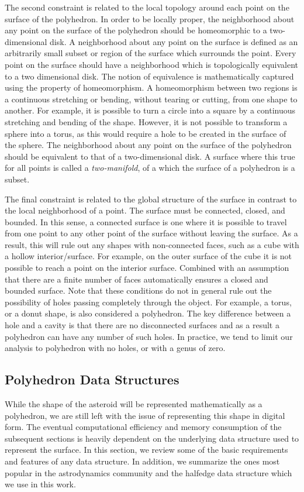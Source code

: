 The second constraint is related to the local topology around each point on the surface of the polyhedron.
In order to be locally proper, the neighborhood about any point on the surface of the polyhedron should be homeomorphic to a two-dimensional disk.
A neighborhood about any point on the surface is defined as an arbitrarily small subset or region of the surface which surrounds the point.
Every point on the surface should have a neighborhood which is topologically equivalent to a two dimensional disk.
The notion of equivalence is mathematically captured using the property of homeomorphism.
A homeomorphism between two regions is a continuous stretching or bending, without tearing or cutting, from one shape to another.
For example, it is possible to turn a circle into a square by a continuous stretching and bending of the shape.
However, it is not possible to transform a sphere into a torus, as this would require a hole to be created in the surface of the sphere.
The neighborhood about any point on the surface of the polyhedron should be equivalent to that of a two-dimensional disk.
A surface where this true for all points is called a \textit{two-manifold}, of a which the surface of a polyhedron is a subset.

The final constraint is related to the global structure of the surface in contrast to the local neighborhood of a point.
The surface must be connected, closed, and bounded.
In this sense, a connected surface is one where it is possible to travel from one point to any other point of the surface without leaving the surface. 
As a result, this will rule out any shapes with non-connected faces, such as a cube with a hollow interior/surface.
For example, on the outer surface of the cube it is not possible to reach a point on the interior surface. 
Combined with an assumption that there are a finite number of faces automatically ensures a closed and bounded surface. 
Note that these conditions do not in general rule out the possibility of holes passing completely through the object.
For example, a torus, or a donut shape, is also considered a polyhedron.
The key difference between a hole and a cavity is that there are no disconnected surfaces and as a result a polyhedron can have any number of such holes. 
In practice, we tend to limit our analysis to polyhedron with no holes, or with a genus of zero.


\subsection{Polyhedron Data Structures}\label{sec:polyhedron_data_structures}
While the shape of the asteroid will be represented mathematically as a polyhedron, we are still left with the issue of representing this shape in digital form. 
The eventual computational efficiency and memory consumption of the subsequent sections is heavily dependent on the underlying data structure used to represent the surface.
In this section, we review some of the basic requirements and features of any data structure.
In addition, we summarize the ones most popular in the astrodynamics community and the halfedge data structure which we use in this work.

